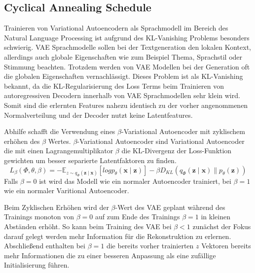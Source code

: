 \subsection{Cyclical Annealing Schedule}
\label{cyc_anneal}
Trainieren von Variational Autoencodern als Sprachmodell im Bereich des Natural Language Processing ist aufgrund des KL-Vanishing Problems besonders schwierig.
VAE Sprachmodelle sollen bei der Textgeneration den lokalen Kontext, allerdings auch globale Eigenschaften wie zum Beispiel Thema, Sprachstil oder Stimmung beachten. 
Trotzdem werden von VAE Modellen bei der Generation oft die globalen Eigenschaften vernachlässigt. 
Dieses Problem ist als KL-Vanishing bekannt, da die KL-Regularisierung des Loss Terms beim Trainieren von autoregressiven Decodern innerhalb von VAE Sprachmodellen sehr klein wird.
Somit sind die erlernten Features nahezu identisch zu der vorher angenommenen Normalverteilung und der Decoder nutzt keine Latentfeatures. %

Abhilfe schafft die Verwendung eines $\beta$-Variational Autoencoder mit zyklischem erhöhen des $\beta$ Wertes.
$\beta$-Variational Autoencoder sind Variational Autoencoder die mit einen Lagrangemultiplikator $\beta$ die KL-Divergenz der Loss-Funktion gewichten um besser separierte Latentfaktoren zu finden.
\begin{equation}
    L_{\beta}(\Phi,\theta,\beta) = -\mathbb{E}_{z\sim q_\Phi(\mathbf{z\mid x})}[log p_\theta (\mathbf{x\mid z})]- \beta D_{KL}(q_\Phi(\mathbf{z\mid x}) \parallel p_\theta(\mathbf{z})) 
\end{equation}
Falls $\beta = 0$ ist wird das Modell wie ein normaler Autoencoder trainiert, bei $\beta = 1$ wie ein normaler Varitional Autoencoder.

Beim Zyklischen Erhöhen wird der $\beta$-Wert des VAE geplant während des Trainings monoton von $\beta=0$ auf zum Ende des Trainings $\beta=1$ in kleinen Abständen erhöht.
So kann beim Training des VAE bei $\beta<1$ zunächst der Fokus darauf gelegt werden mehr Information für die Rekonstruktion zu erlernen. 
Abschließend enthalten bei $\beta=1$ die bereits vorher trainierten $z$ Vektoren bereits mehr Informationen die zu einer besseren Anpassung als eine zufällige Initialisierung führen.




